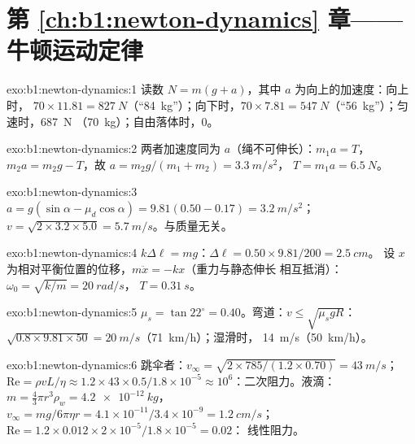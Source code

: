 \section*{第 \ref{ch:b1:newton-dynamics} 章——牛顿运动定律}

\begin{solution}{exo:b1:newton-dynamics:1}
读数 $N = m(g + a)$，其中 $a$ 为向上的加速度：向上时，
$70 \times 11.81 = \qty{827}{N}$（``\qty{84}{kg}''）；向下时，$70 \times 7.81 =
\qty{547}{N}$（``\qty{56}{kg}''）；匀速时，\qty{687}{N}
（\qty{70}{kg}）；自由落体时，$0$。
\end{solution}

\begin{solution}{exo:b1:newton-dynamics:2}
两者加速度同为 $a$（绳不可伸长）：$m_1a = T$，
$m_2a = m_2g - T$，故 $a = m_2g/(m_1 + m_2) = \qty{3.3}{m/s^2}$，
$T = m_1a = \qty{6.5}{N}$。
\end{solution}

\begin{solution}{exo:b1:newton-dynamics:3}
$a = g(\sin\alpha - \mu_d\cos\alpha) = 9.81(0.50 - 0.17) = \qty{3.2}{m/s^2}$；
$v = \sqrt{2 \times 3.2 \times 5.0} = \qty{5.7}{m/s}$。与质量无关。
\end{solution}

\begin{solution}{exo:b1:newton-dynamics:4}
$k\Delta\ell = mg$：$\Delta\ell = 0.50 \times 9.81/200 = \qty{2.5}{cm}$。
设 $x$ 为相对平衡位置的位移，$m\ddot x = -kx$（重力与静态伸长
相互抵消）：$\omega_0 = \sqrt{k/m} = \qty{20}{rad/s}$，
$T = \qty{0.31}{s}$。
\end{solution}

\begin{solution}{exo:b1:newton-dynamics:5}
$\mu_s = \tan 22^\circ = 0.40$。弯道：$v \leq \sqrt{\mu_sgR}$：$\sqrt{0.8
\times 9.81 \times 50} = \qty{20}{m/s}$（\qty{71}{km/h}）；湿滑时，
\qty{14}{m/s}（\qty{50}{km/h}）。
\end{solution}

\begin{solution}{exo:b1:newton-dynamics:6}
跳伞者：$v_\infty = \sqrt{2 \times 785/(1.2 \times 0.70)} = \qty{43}{m/s}$；
$\mathrm{Re} = \rho vL/\eta \approx 1.2 \times 43 \times 0.5/1.8\times10^{-5}
\approx 10^6$：二次阻力。液滴：$m = \tfrac43\pi r^3\rho_w = \qty{4.2e-12}{kg}$，
$v_\infty = mg/6\pi\eta r = 4.1\times10^{-11}/3.4\times10^{-9} = \qty{1.2}{cm/s}$；
$\mathrm{Re} = 1.2 \times 0.012 \times 2\times10^{-5}/1.8\times10^{-5} = 0.02$：
线性阻力。
\end{solution}

